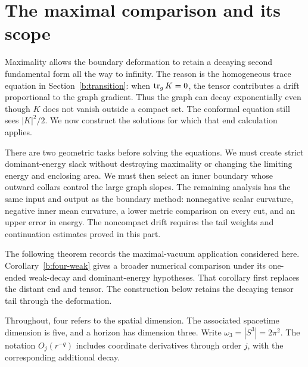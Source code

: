 \section{The maximal comparison and its scope}
\label{four:maximal:section}

Maximality allows the boundary deformation to retain a decaying second
fundamental form all the way to infinity.  The reason is the homogeneous
trace equation in Section~\ref{b:transition}: when $\operatorname{tr}_gK=0$, the tensor
contributes a drift proportional to the graph gradient.  Thus the graph
can decay exponentially even though $K$ does not vanish outside a compact
set.  The conformal equation still sees $|K|^2/2$.  We now construct the
solutions for which that end calculation applies.

There are two geometric tasks before solving the equations.  We must
create strict dominant-energy slack without destroying maximality or
changing the limiting energy and enclosing area.  We must then select an
inner boundary whose outward collars control the large graph slopes.
The remaining analysis has the same input and output as the boundary
method: nonnegative scalar curvature, negative inner mean curvature,
a lower metric comparison on every cut, and an upper error in energy.
The noncompact drift requires the tail weights and continuation estimates
proved in this part.

The following theorem records the maximal-vacuum application considered
here.  Corollary~\ref{b:four-weak} gives a broader numerical comparison
under its one-ended weak-decay and dominant-energy hypotheses.  That
corollary first replaces the distant end and tensor.  The construction
below retains the decaying tensor tail through the deformation.

Throughout, four refers to the spatial dimension. The associated spacetime
dimension is five, and a horizon has dimension three. Write
\(\omega_3=|S^3|=2\pi^2\). The notation \(O_j(r^{-q})\) includes coordinate
derivatives through order \(j\), with the corresponding additional decay.

